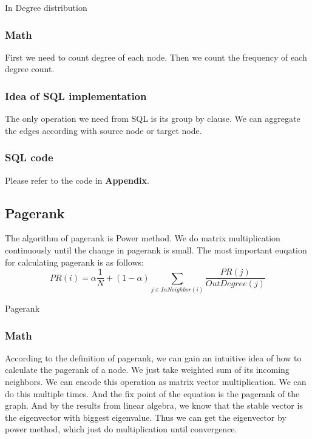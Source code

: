 \begin{algorithm}[!htbf]
\caption{In Degree distribution}
\begin{algorithmic}
\end{algorithmic}
\label{algo1:2}
\end{algorithm}

\subsubsection{Math}
First we need to count degree of each node. Then we count the frequency of each degree count. 

\subsubsection{Idea of SQL implementation}
The only operation we need from SQL is its group by clause. We can aggregate the edges according with source node or target node.

\subsubsection{SQL code}
Please refer to the code in {\bf Appendix}.

\subsection{Pagerank}
The algorithm of pagerank is Power method. We do matrix multiplication continuously until the change in pagerank is small. The most important euqation for calculating pagerank is as follows:
\begin{equation}
  PR(i) = \alpha \frac{1}{N} + (1 - \alpha) \sum_{j \in InNeighbor(i)} \frac{PR(j)}{OutDegree(j)}
\end{equation}
\begin{algorithm}
\caption{Pagerank}
\begin{algorithmic}
\REPEAT
{}
\end{algorithmic}
\end{algorithm}

\subsubsection{Math}
According to the definition of pagerank, we can gain an intuitive idea of how to calculate the pagerank of a node.
We just take weighted sum of its incoming neighbors. We can encode this operation as matrix vector multiplication.
We can do this multiple times. And the fix point of the equation is the pagerank of the graph. And by the results 
from linear algebra, we know that the stable vector is the eigenvector with biggest eigenvalue. Thus we can get 
the eigenvector by power method, which just do multiplication until convergence. 

